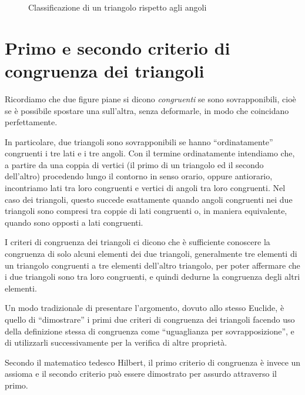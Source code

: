 \begin{inaccessibleblock}
 \begin{figure}[htb]
\centering
\caption{Classificazione di un triangolo rispetto agli 
angoli}\label{fig:class_triangolo_angoli}
\end{figure}
\end{inaccessibleblock}

\section{Primo e secondo criterio di congruenza dei 
triangoli}\label{sect:primo_secondo_criterio_di_congruenza_triangoli}

Ricordiamo che due figure piane si dicono \emph{congruenti} se sono 
sovrapponibili, cioè se è possibile spostare una sull'altra, senza 
deformarle, in modo che coincidano perfettamente. 

In particolare, due triangoli sono sovrapponibili se hanno 
``ordinatamente'' congruenti i tre lati e i tre angoli. Con il 
termine ordinatamente intendiamo che, a partire da una coppia di 
vertici (il primo di un triangolo ed il secondo dell'altro) procedendo 
lungo il contorno in senso orario, oppure antiorario, incontriamo lati 
tra loro congruenti e vertici di angoli tra loro congruenti. Nel caso 
dei triangoli, questo succede esattamente quando angoli congruenti nei 
due triangoli sono compresi tra coppie di lati congruenti o, in 
maniera equivalente, quando sono opposti a lati congruenti.

I criteri di congruenza dei triangoli ci dicono che è sufficiente 
conoscere la congruenza di solo alcuni elementi dei due triangoli, 
generalmente tre elementi di un triangolo congruenti a tre elementi 
dell'altro triangolo, per poter affermare che i due triangoli sono 
tra loro congruenti, e quindi dedurne la congruenza degli altri 
elementi.

Un modo tradizionale di presentare l'argomento, dovuto allo stesso 
Euclide, è quello di ``dimostrare'' i primi due criteri di congruenza 
dei triangoli facendo uso della definizione stessa di congruenza come 
``uguaglianza per sovrapposizione'', e di utilizzarli successivamente 
per la verifica di altre proprietà.

Secondo il matematico tedesco Hilbert, il primo criterio di 
congruenza è invece un assioma e il secondo criterio può essere 
dimostrato per assurdo attraverso il primo. 

